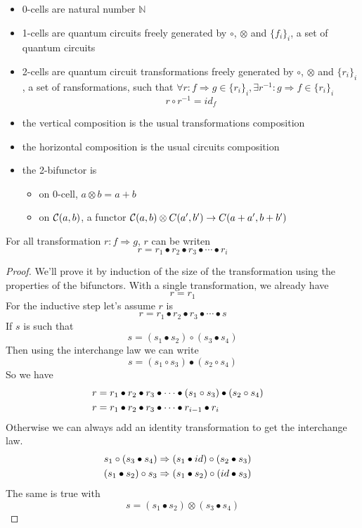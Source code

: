 \documentclass[a4paper]{article}
\begin{document}
\begin{itemize}
\item 0-cells are natural number $\mathbb{N}$
\item 1-cells are quantum circuits freely generated by $\circ$, $\otimes$ and $\{f_i\}_i$, a set of quantum circuits
\item 2-cells are quantum circuit transformations freely generated by $\circ$, $\otimes$ and $\{r_i\}_i$, a set of ransformations, such that $\forall r: f \Rightarrow g \in \{r_i\}_i, \exists r^{-1}: g \Rightarrow f \in \{r_i\}_i$
\[
r \circ r^{-1} = id_f
\]
\item the vertical composition is the usual transformations composition
\item the horizontal composition is the usual circuits composition
\item the 2-bifunctor is
\begin{itemize}
\item on 0-cell, $a \otimes b = a + b$
\item on ${\cal C}(a, b)$, a functor ${\cal C}(a, b) \otimes C(a', b') \to C(a + a', b + b')$
\end{itemize}
\end{itemize}

\begin{proposition}
For all transformation $r: f \Rightarrow g$, $r$ can be writen
\[
r = r_1 \bullet r_2 \bullet r_3 \bullet \cdots \bullet r_i
\]

\begin{proof}
We'll prove it by induction of the size of the transformation using the properties of the bifunctors.
With a single transformation, we already have
\[
r = r_1
\]
For the inductive step let's assume $r$ is
\[
r = r_1 \bullet r_2 \bullet r_3 \bullet \cdots \bullet s
\]
If $s$ is such that
\[
s = (s_1 \bullet s_2) \circ (s_3 \bullet s_4)
\]
Then using the interchange law we can write
\[
s = (s_1 \circ s_3) \bullet (s_2 \circ s_4)
\]
So we have 
\begin{align}
r &= r_1 \bullet r_2 \bullet r_3 \bullet \cdots \bullet (s_1 \circ s_3) \bullet (s_2 \circ s_4) \cr
r &= r_1 \bullet r_2 \bullet r_3 \bullet \cdots \bullet r_{i - 1} \bullet r_i
\end{align}
Otherwise we can always add an identity transformation to get the interchange law.
\begin{align}
s_1 \circ (s_3 \bullet s_4) &\Rightarrow (s_1 \bullet id) \circ (s_2 \bullet s_3) \cr
(s_1 \bullet s_2) \circ s_3 &\Rightarrow (s_1 \bullet s_2) \circ (id \bullet s_3)
\end{align}
The same is true with
\[
s = (s_1 \bullet s_2) \otimes (s_3 \bullet s_4)
\]
\end{proof}
\end{proposition}
\end{document}
